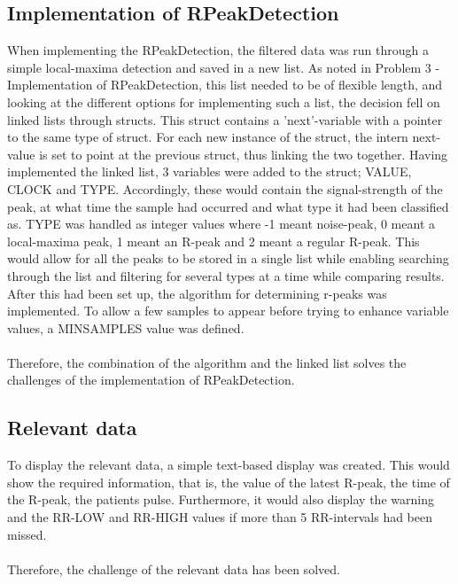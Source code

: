 \documentclass[12pt,a4paper]{article}
\begin{document}
\subsection{Implementation of RPeakDetection}
	When implementing the RPeakDetection, the filtered data was run through a simple local-maxima detection and saved in a new list. As noted in Problem 3 - Implementation of RPeakDetection, this list needed to be of flexible length, and looking at the different options for implementing such a list, the decision fell on linked lists through structs. This struct contains a 'next'-variable with a pointer to the same type of struct. For each new instance of the struct, the intern next-value is set to point at the previous struct, thus linking the two together. 
	Having implemented the linked list, 3 variables were added to the struct; VALUE, CLOCK and TYPE. Accordingly, these would contain the signal-strength of the peak, at what time the sample had occurred and what type it had been classified as. TYPE was handled as integer values where -1 meant noise-peak, 0 meant a local-maxima peak, 1 meant an R-peak and 2 meant a regular R-peak. This would allow for all the peaks to be stored in a single list while enabling searching through the list and filtering for several types at a time while comparing results. 
	After this had been set up, the algorithm for determining r-peaks was implemented. To allow a few samples to appear before trying to enhance variable values, a MINSAMPLES value was defined.\\
	\\
	Therefore, the combination of the algorithm and the linked list solves the challenges of the implementation of RPeakDetection.
	
\subsection{Relevant data}
	To display the relevant data, a simple text-based display was created. This would show the required information, that is, the value of the latest R-peak, the time of the R-peak, the patients pulse. Furthermore, it would also display the warning and the RR-LOW and RR-HIGH values if more than 5 RR-intervals had been missed.\\
	\\
	Therefore, the challenge of the relevant data has been solved.
\end{document}
